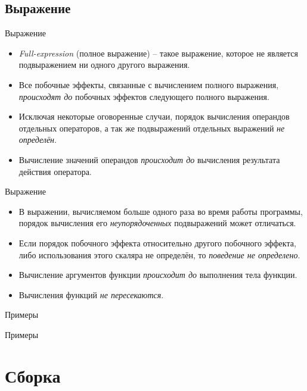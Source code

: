 \documentclass[xetex,mathserif,serif,10pt]{beamer}
\begin{document}
    \subsection{Выражение}
    \begin{frame}{Выражение}
        \begin{itemize}
            \item \textit{Full-expression} (полное выражение) -- такое выражение, которое не является подвыражением ни одного другого выражения.
            \item Все побочные эффекты, связанные с вычислением полного выражения, \textit{происходят до} побочных эффектов следующего полного выражения.
            \item Исключая некоторые оговоренные случаи, порядок вычисления операндов отдельных операторов, а так же подвыражений отдельных выражений \textit{не определён}.
            \item Вычисление значений операндов \textit{происходит до} вычисления результата действия оператора.
        \end{itemize}
    \end{frame}
    \begin{frame}{Выражение}
        \begin{itemize}
            \item В выражении, вычисляемом больше одного раза во время работы программы, порядок вычисления его \textit{неупорядоченных} подвыражений может отличаться.
            \item Если порядок побочного эффекта относительно другого побочного эффекта, либо использования этого скаляра не определён, то \textit{поведение не определено}.
            \item Вычисление аргументов функции \textit{происходит до } выполнения тела функции.
            \item Вычисления функций \textit{не пересекаются}.
        \end{itemize}
    \end{frame}
    \begin{frame}{Примеры}
        
    \end{frame}
    \begin{frame}{Примеры}
        
    \end{frame}

    \section{Сборка}
\end{document}
